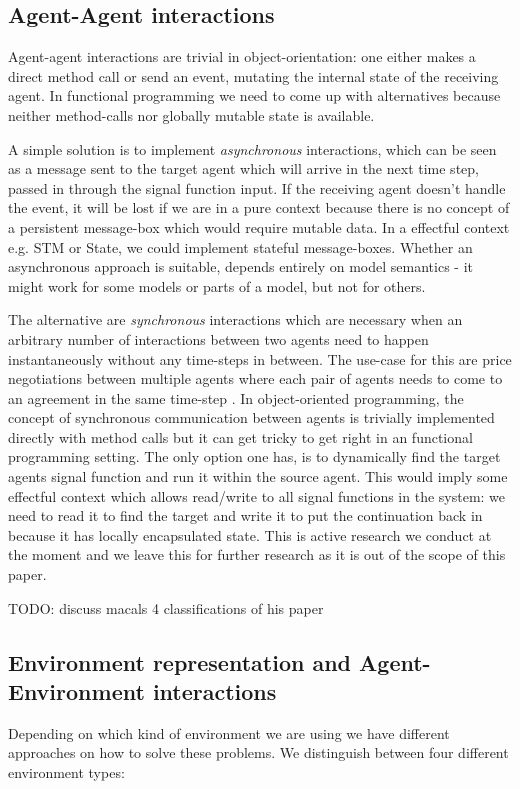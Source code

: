 \subsection{Agent-Agent interactions}
Agent-agent interactions are trivial in object-orientation: one either makes a direct method call or send an event, mutating the internal state of the receiving agent. In functional programming we need to come up with alternatives because neither method-calls nor globally mutable state is available.

A simple solution is to implement \textit{asynchronous} interactions, which can be seen as a message sent to the target agent which will arrive in the next time step, passed in through the signal function input. If the receiving agent doesn't handle the event, it will be lost if we are in a pure context because there is no concept of a persistent message-box which would require mutable data. In a effectful context e.g. STM or State, we could implement stateful message-boxes. Whether an asynchronous approach is suitable, depends entirely on model semantics - it might work for some models or parts of a model, but not for others.

The alternative are \textit{synchronous} interactions which are necessary when an arbitrary number of interactions between two agents need to happen instantaneously without any time-steps in between. The use-case for this are price negotiations between multiple agents where each pair of agents needs to come to an agreement in the same time-step \cite{epstein_growing_1996}. In object-oriented programming, the concept of synchronous communication between agents is trivially implemented directly with method calls but it can get tricky to get right in an functional programming setting. The only option one has, is to dynamically find the target agents signal function and run it within the source agent. This would imply some effectful context which allows read/write to all signal functions in the system: we need to read it to find the target and write it to put the continuation back in because it has locally encapsulated state. This is active research we conduct at the moment and we leave this for further research as it is out of the scope of this paper.

TODO: discuss macals 4 classifications of his paper  \cite{macal_everything_2016} 

\subsection{Environment representation and Agent-Environment interactions}
Depending on which kind of environment we are using we have different approaches on how to solve these problems. We distinguish between four different environment types:

